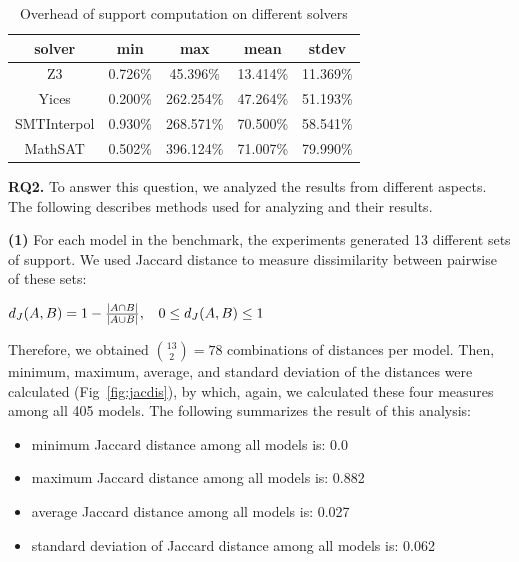 \begin{table}
  \centering
  \begin{tabular}{ |c||c|c|c|c| }
    \hline
     solver & min & max & mean & stdev \\[0.5ex]
    \hline
    Z3   & 0.726\% & 45.396\% & 13.414\% & 11.369\% \\[0.5ex]
    Yices &   0.200\%  & 262.254\%   & 47.264\% & 51.193\% \\[0.5ex]
    SMTInterpol& 0.930\% & 268.571\% &  70.500\% & 58.541\%\\[0.5ex]
    MathSAT & 0.502\% & 396.124\% &  71.007\% & 79.990\%\\[0.5ex]
    \hline
  \end{tabular}
  \caption{\small{Overhead of support computation on different solvers}}
  \label{tab:overhead}
\end{table}

\vspace{6pt}
\noindent{}
 \vspace{9pt}

\textbf{RQ2.} To answer this question, we analyzed the results from different aspects. The following describes methods used for analyzing and their results.

\textbf{(1)} For each model in the benchmark, the experiments generated 13 different sets of support. We used Jaccard distance to measure dissimilarity between pairwise of these sets:

\begin{center}
$d_J(\small{A}, \small{B}) = 1 - \frac{|A \cap B|}{|A \cup B|} ,\hspace{9pt} 0 \leq d_J(\small{A}, \small{B}) \leq 1$
\end{center}
\vspace{6pt}

Therefore, we obtained $\binom{13}{2} = 78$ combinations of distances per model. Then, minimum, maximum, average, and standard deviation of the distances were calculated (Fig~\ref{fig:jacdis}), by which, again, we calculated these four measures among all 405 models. The following summarizes the result of this analysis:
\begin{itemize}
  \item minimum Jaccard distance among all models is: 0.0
  \item maximum Jaccard distance among all models is: 0.882
  \item average Jaccard distance among all models is: 0.027
  \item standard deviation of Jaccard distance among all models is: 0.062
\end{itemize}


